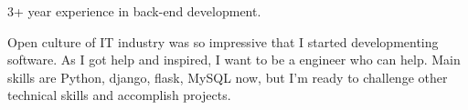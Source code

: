 

\begin{cvparagraph}

3+ year experience in back-end development.

Open culture of IT industry was so impressive that I started developmenting software. As I got help and inspired, I want to be a engineer who can help.
Main skills are Python, django, flask, MySQL now, but I'm ready to challenge other technical skills and accomplish projects.

\end{cvparagraph}

